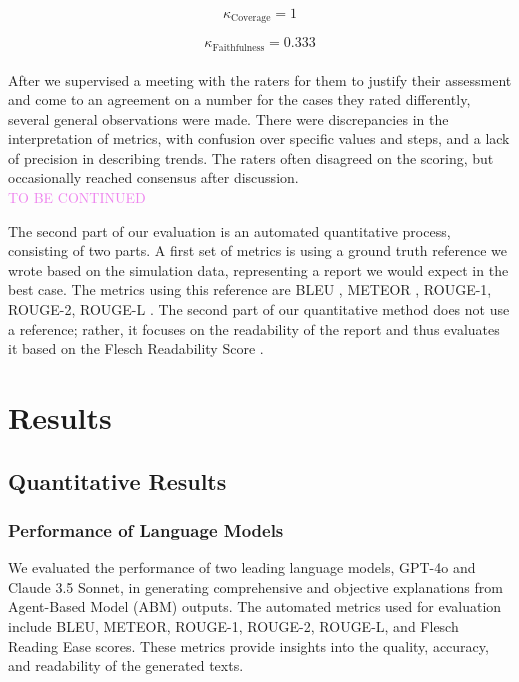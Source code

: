 \documentclass[preprint,12pt]{elsarticle}
\begin{document}
\[
\kappa_{\text{Coverage}} = 1
\]

\[
\kappa_{\text{Faithfulness}} = 0.333
\] \\

After we supervised a meeting with the raters for them to justify their assessment and come to an agreement on a number for the cases they rated differently, several general observations were made. There were discrepancies in the interpretation of metrics, with confusion over specific values and steps, and a lack of precision in describing trends. The raters often disagreed on the scoring, but occasionally reached consensus after discussion. \\ \textcolor{violet}{TO BE CONTINUED}


The second part of our evaluation is an automated quantitative process, consisting of two parts. A first set of metrics is using a ground truth reference we wrote based on the simulation data, representing a report we would expect in the best case. The metrics using this reference are BLEU \cite{Zhang2024} \cite{Papineni2002} \cite{Brown2024}, METEOR \cite{Brown2024}, ROUGE-1, ROUGE-2, ROUGE-L \cite{Zhang2024} \cite{Lin2004} \cite{Brown2024}. The second part of our quantitative method does not use a reference; rather, it focuses on the readability of the report and thus evaluates it based on the Flesch Readability Score \cite{Cooperman2024}.






\section{Results}
\label{sec4}

\subsection{Quantitative Results}

\subsubsection{Performance of Language Models}

We evaluated the performance of two leading language models, GPT-4o and Claude 3.5 Sonnet, in generating comprehensive and objective explanations from Agent-Based Model (ABM) outputs. The automated metrics used for evaluation include BLEU, METEOR, ROUGE-1, ROUGE-2, ROUGE-L, and Flesch Reading Ease scores. These metrics provide insights into the quality, accuracy, and readability of the generated texts.
\end{document}
